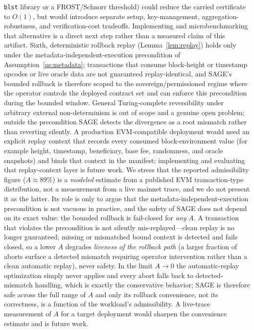\documentclass[journal]{IEEEtran}
\theoremstyle{definition}
\theoremstyle{remark}
\begin{document}
\texttt{blst} library or a FROST/Schnorr threshold) could reduce the carried certificate to $O(1)$,
but would introduce separate setup, key-management, aggregation-robustness, and verification-cost
tradeoffs. Implementing and microbenchmarking that alternative is a direct next step rather than a
measured claim of this artifact. Sixth, deterministic rollback replay (Lemma~\ref{lem:replay}) holds only under
the metadata-independent-execution precondition of Assumption~\ref{as:metadata}; transactions that
consume block-height or timestamp opcodes or live oracle data are not guaranteed replay-identical,
and SAGE's bounded rollback is therefore scoped to the sovereign/permissioned regime where the
operator controls the deployed contract set and can enforce this precondition during the bounded
window. General Turing-complete reversibility under arbitrary external non-determinism is out of
scope and a genuine open problem; outside the precondition SAGE detects the divergence as a root
mismatch rather than reverting silently. A production EVM-compatible deployment would need an
explicit replay context that records every consumed block-environment value (for example height,
timestamp, beneficiary, base fee, randomness, and oracle snapshots) and binds that context in the
manifest; implementing and evaluating that replay-context layer is future work. We stress that the
reported admissibility figure ($A\approx 89\%$) is a \emph{modeled} estimate from a published
EVM transaction-type distribution, not a measurement from a live mainnet trace, and we do not
present it as the latter. Its role is only to argue that the metadata-independent-execution
precondition is not vacuous in practice, and the safety of SAGE does not depend on its exact value:
the bounded rollback is fail-closed for \emph{any} $A$. A transaction that violates the
precondition is not silently mis-replayed---clean replay is no longer guaranteed; missing or mismatched bound context is detected and fails closed, so a lower $A$ degrades \emph{liveness of the rollback
path} (a larger fraction of aborts surface a detected mismatch requiring operator intervention
rather than a clean automatic replay), never safety. In the limit $A\to 0$ the automatic-replay
optimization simply never applies and every abort falls back to detected-mismatch handling, which
is exactly the conservative behavior; SAGE is therefore safe across the full range of $A$ and only
its rollback convenience, not its correctness, is a function of the workload's admissibility. A
live-trace measurement of $A$ for a target deployment would sharpen the convenience estimate and is
future work.
\end{document}
